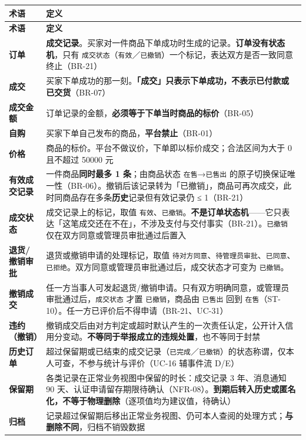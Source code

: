 \documentclass[12pt,a4paper]{ctexart}
\begin{document}
{\scriptsize
\begin{longtable}{|p{2.75cm}|p{13.25cm}|}
\hline
\textbf{术语} & \textbf{定义} \\
\hline
\endfirsthead
\hline
\textbf{术语} & \textbf{定义} \\
\hline
\endhead
\hline
\endfoot
\textbf{订单} & \textbf{成交记录}。买家对一件商品下单成功时生成的记录。\textbf{订单没有状态机}，只有 \texttt{成交状态}（\texttt{有效}／\texttt{已撤销}）一个标记，表达双方是否一致同意终止（BR-21） \\
\hline
\textbf{成交} & 买家下单成功的那一刻。\textbf{「成交」只表示下单成功，不表示已付款或已交货}（BR-07） \\
\hline
\textbf{成交金额} & 订单记录的金额，\textbf{必须等于下单当时商品的标价}（BR-05） \\
\hline
\textbf{自购} & 买家下单自己发布的商品，\textbf{平台禁止}（BR-01） \\
\hline
\textbf{价格} & 商品的标价。平台不做议价，下单即以标价成交；合法区间为大于 0 且不超过 50000 元 \\
\hline
\textbf{有效成交记录} & 一件商品\textbf{同时最多 1 条}；由商品状态 \texttt{在售}→\texttt{已售出} 的原子切换保证唯一性（BR-06）。撤销后该记录转为「已撤销」，商品可再次成交，此时同商品存在多条\textbf{历史}记录但有效记录仍 ≤ 1（BR-21） \\
\hline
\textbf{成交状态} & 成交记录上的标记，取值 \texttt{有效}、\texttt{已撤销}。\textbf{不是订单状态机}——它只表达「这笔成交还在不在」，不涉及支付与交付事实（BR-21）。\texttt{已撤销} 仅在双方同意或管理员审批通过后置入 \\
\hline
\textbf{退货/撤销审批} & 退货或撤销申请的处理标记，取值 \texttt{待对方同意}、\texttt{待管理员审批}、\texttt{已同意}、\texttt{已拒绝}。双方同意或管理员审批通过后，成交状态才可变为 \texttt{已撤销}。 \\
\hline
\textbf{撤销成交} & 任一方当事人可发起退货/撤销申请。只有双方明确同意，或管理员审批通过后，\texttt{成交状态} 才置 \texttt{已撤销}，商品由 \texttt{已售出} 回到 \texttt{在售}（ST-10）。任一方已评价后不得申请（BR-21、UC-31） \\
\hline
\textbf{违约（撤销）} & 撤销成交后由对方判定或超时默认产生的一次责任认定，公开计入信用分变动。\textbf{不等同于举报成立的违规处置}，也不等同于封禁 \\
\hline
\textbf{历史订单} & 超过保留期或已结束的成交记录（\texttt{已完成}／\texttt{已撤销}）的状态称谓，仅本人可查，不参与统计与评价（UC-16 辅事件流 D/E） \\
\hline
\textbf{保留期} & 各类记录在正常业务视图中保留的时长：成交记录 3 年、消息通知 90 天、认证申请留存期限待确认（NFR-08）。\textbf{到期后转入历史或匿名化，不等于物理删除}（逐项值均为建议值，待确认） \\
\hline
\textbf{归档} & 记录超过保留期后移出正常业务视图、仍可本人查阅的处理方式；\textbf{与删除不同}，归档不销毁数据 \\
\hline
\end{longtable}
}
\end{document}
